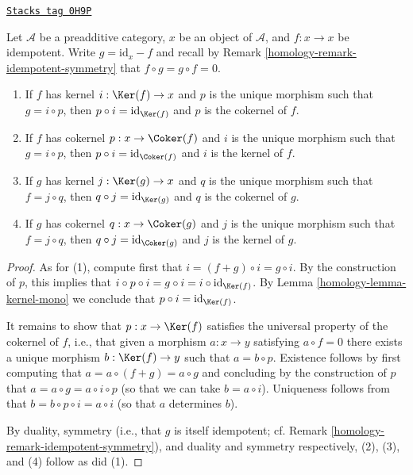 \begin{lemma}
\label{homology-lemma-idempotent-kernel-cokernel}
\href{https://stacks.math.columbia.edu/tag/0H9P}{\texttt{Stacks tag 0H9P}}

Let $\mathcal{A}$ be a preadditive category,
$x$ be an object of $\mathcal{A}$,
and $f : x \to x$ be idempotent.
Write $g = \text{id} _ x - f$
and recall by Remark \ref{homology-remark-idempotent-symmetry}
that $f \circ g = g \circ f = 0$.
\begin{enumerate}
\item If $f$ has kernel $i : \Ker (f) \to x$
and $p$ is the unique morphism such that $g = i \circ p$,
then $p \circ i = \text{id} _ {\Ker (f)}$
and $p$ is the cokernel of $f$.
\item If $f$ has cokernel $p : x \to \Coker (f)$
and $i$ is the unique morphism such that $g = i \circ p$,
then $p \circ i = \text{id} _ {\Coker (f)}$
and $i$ is the kernel of $f$.
\item If $g$ has kernel $j : \Ker (g) \to x$
and $q$ is the unique morphism such that $f = j \circ q$,
then $q \circ j = \text{id} _ {\Ker (g)}$
and $q$ is the cokernel of $g$.
\item If $g$ has cokernel $q : x \to \Coker (g)$
and $j$ is the unique morphism such that $f = j \circ q$,
then $q \circ j = \text{id} _ {\Coker (g)}$
and $j$ is the kernel of $g$.
\end{enumerate}
\end{lemma}

\begin{proof}

As for (1), compute first that $i = (f + g) \circ i = g \circ i$.
By the construction of $p$, this implies that
$i \circ p \circ i = g \circ i = i \circ \text{id} _ {\Ker (f)}$.
By Lemma \ref{homology-lemma-kernel-mono} we conclude that
$p \circ i = \text{id} _ {\Ker (f)}$.

\medskip\noindent
It remains to show that $p : x \to \Ker (f)$
satisfies the universal property of the cokernel of $f$,
i.e., that given a morphism $a : x \to y$ satisfying $a \circ f = 0$
there exists a unique morphism $b : \Ker (f) \to y$
such that $a = b \circ p$.
Existence follows by first computing that $a = a \circ (f + g) = a \circ g$
and concluding by the construction of $p$
that $a = a \circ g = a \circ i \circ p$
(so that we can take $b = a \circ i$).
Uniqueness follows from that $b = b \circ p \circ i = a \circ i$
(so that $a$ determines $b$).

\medskip\noindent
By duality,
symmetry (i.e., that $g$ is itself idempotent;
cf. Remark \ref{homology-remark-idempotent-symmetry}),
and duality and symmetry respectively, (2), (3), and (4) follow as did (1).
\end{proof}

